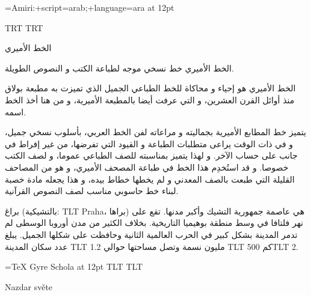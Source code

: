 \documentclass{article}
\newcommand\textlatin[1]{\bgroup\textdir TLT #1\egroup}
\begin{document}
\font\amiri={Amiri:+script=arab;+language=ara} at 12pt
\amiri
\startharfbuzz


\textdir TRT
\pardir TRT

الخط الأميري 

الخط الأميري خط نسخي موجه لطباعة الكتب و النصوص الطويلة.

الخط الأميري هو إحياء و محاكاة للخط الطباعي الجميل الذي تميزت به مطبعة بولاق منذ أوائل القرن العشرين، و التي عرفت أيضا بالمطبعة الأميرية، و من هنا أخذ الخط اسمه.

يتميز خط المطابع الأميرية بجماليته و مراعاته لفن الخط العربي، بأسلوب نسخي جميل، و في ذات الوقت يراعى متطلبات الطباعة و القيود التي تفرضها، من غير إفراط في جانب على حساب الآخر. و لهذا يتميز بمناسبته للصف الطباعي عموما، و لصف الكتب خصوصا. و قد استُخدِم هذا الخط في طباعة المصحف الأميري، و هو من المصاحف القليلة التي طبعت بالصف المعدني و لم يخطها خطاط بيده، و هذا يجعله مادة خصبة لبناء خط حاسوبي مناسب لصف النصوص القرآنية.

براغ (بالتشيكية: \textlatin{Praha}، براها) هي عاصمة جمهورية التشيك وأكبر مدنها. تقع على نهر فلتافا في وسط منطقة بوهيميا التاريخية. بخلاف الكثير من مدن أوروبا الوسطى لم تدمر المدينة بشكل كبير في الحرب العالمية الثانية وحافظت على شكلها الجميل. يبلغ عدد سكان المدينة \textlatin{1.2} مليون نسمة وتصل مساحتها حوالي \textlatin{500} كم\textlatin{2.}

\font\tgschola={TeX Gyre Schola} at 12pt
\tgschola
\textdir TLT
\pardir TLT

Nazdar světe
\end{document}
